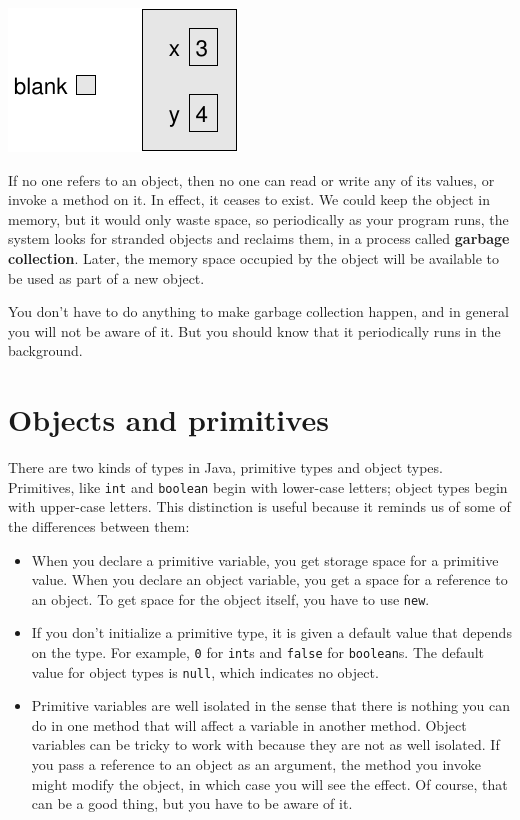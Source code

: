\documentclass[12pt]{book}
\theoremstyle{exercise}
\begin{document}
\includegraphics{figs/reference3.pdf}


If no one refers to an object, then no one can read or write any of
its values, or invoke a method on it.  In effect, it ceases to exist.
We could keep the object in memory, but it would only waste space, so
periodically as your program runs, the system looks for stranded
objects and reclaims them, in a process called {\bf garbage
collection}.  Later, the memory space occupied by the object will
be available to be used as part of a new object.

You don't have to do anything to make garbage collection happen,
and in general you will not be aware of it.  But you
should know that it periodically runs in the background.


\section {Objects and primitives}

There are two kinds of types in Java, primitive types and
object types.  Primitives, like {\tt int} and {\tt boolean}
begin with lower-case letters; object types begin with
upper-case letters.  This distinction is useful because it
reminds us of some of the differences between them:

\begin{itemize}

\item When you declare a primitive variable, you get storage
space for a primitive value.  When you declare an object variable, you
get a space for a reference to an object.  To get space for
the object itself, you have to use {\tt new}.

\item If you don't initialize a primitive type, it is given
a default value that depends on the type.  For example,
{\tt 0} for {\tt int}s and {\tt false} for {\tt boolean}s.
The default value for object types is {\tt null}, which indicates
no object.

\item Primitive variables are well isolated in the sense that there is
nothing you can do in one method that will affect a variable in
another method.  Object variables can be tricky to work with because
they are not as well isolated.  If you pass a reference to an object
as an argument, the method you invoke might modify the object, in which
case you will see the effect.  Of course, that can be a good thing, but you
have to be aware of it.

\end{itemize}
\end{document}
